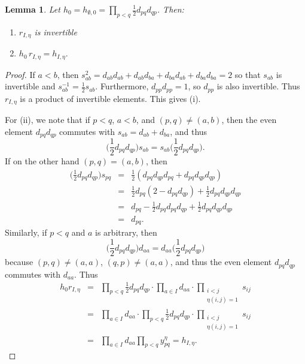 \documentclass[11pt]{article}
\newtheorem{lemma}{Lemma}
\newcommand{\myd}{d}
\begin{document}
\begin{lemma}\label{lem:rIeta}
        Let $h_0 = h_{\emptyset, 0} = \prod_{p<q}\frac{1}{2}\myd_{pq}\myd_{qp}$.
    Then: \begin{enumerate}[label={\rm(\roman*)}] \item $r_{I,\eta}$ is invertible  \item $h_0\,r_{I,\eta}=h_{I,\eta}.$ \end{enumerate}
\end{lemma}
\begin{proof}
    If $a<b$, then $s_{ab}^2 = \myd_{ab} \myd_{ab} + \myd_{ab}\myd_{ba}+\myd_{ba}\myd_{ab} + \myd_{ba}\myd_{ba} = 2$ so that $s_{ab}$ is invertible and $s_{ab}^{-1}= \frac{1}{2} s_{ab}$.  Furthermore, $\myd_{pp} \myd_{pp}=1$, so $\myd_{pp}$ is also invertible. Thus $r_{I,\eta}$ is a product of invertible elements.  This gives (i).

    For (ii), we note that if $p<q$, $a<b$, and $(p,q)\neq(a,b)$, then  the even element
    $\myd_{pq}\myd_{qp}$ commutes with $s_{ab}  = \myd_{ab}+\myd_{ba}$, and thus $$\bigl(\frac{1}{2}\myd_{pq}\myd_{qp} \bigr)s_{ab}=s_{ab} \bigl(\frac{1}{2}\myd_{pq}\myd_{qp}\bigr).$$
    If on the other hand $(p,q)=(a,b)$, then
    \begin{eqnarray*}
        \bigl(\frac{1}{2}\myd_{pq}\myd_{qp}\bigr) s_{pq} &=& \frac{1}{2}(\myd_{pq}\myd_{qp}\myd_{pq} + \myd_{pq}\myd_{qp} \myd_{qp}) \\
        &=& \frac{1}{2} \myd_{pq} (2-\myd_{pq}\myd_{qp}) + \frac{1}{2} \myd_{pq}\myd_{qp} \myd_{qp} \\&=& \myd_{pq} - \frac{1}{2} \myd_{pq}\myd_{pq} \myd_{qp} + \frac{1}{2}\myd_{pq}\myd_{qp}\myd_{qp} \\ &=& \myd_{pq}.
    \end{eqnarray*}
    Similarly, if $p<q$ and $a$ is arbitrary, then $$\bigl(\frac{1}{2}\myd_{pq}\myd_{qp}) \myd_{aa}
    =\myd_{aa} \bigl(\frac{1}{2} \myd_{pq} \myd_{qp}) $$ because  $(p,q)\neq(a,a)$, $(q,p)\neq (a,a)$, and thus the even element $\myd_{pq}\myd_{qp}$ commutes with $\myd_{aa}$.  Thus
    \begin{eqnarray*}
        h_0 r_{I,\eta} &=& \prod_{p<q} \frac{1}{2} \myd_{pq}\myd_{qp} \cdot \prod_{a\in I}\myd_{aa} \cdot \prod_{\substack{i<j\\ \eta(i,j)=1}} 
    s_{ij}\\ &=& \prod_{a\in I}\myd_{aa} \cdot \prod_{p<q} \frac{1}{2} \myd_{pq}\myd_{qp} \cdot \prod_{\substack{i<j\\ \eta(i,j)=1}} s_{ij} \\ &=& \prod_{a\in I}\myd_{aa} 
    \prod_{p<q} y_{pq}^\eta = h_{I,\eta}.
    \end{eqnarray*}
\end{proof}
\end{document}
